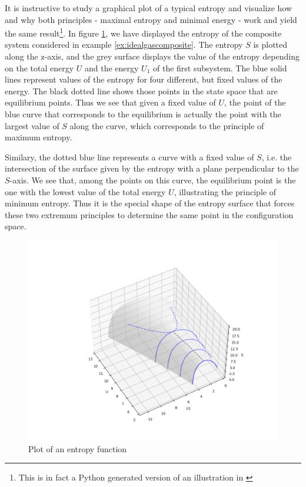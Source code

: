 \documentclass[a4paper, draft]{article}
\theoremstyle{own}
\theoremstyle{remark}
\begin{document}
It is instructive to study a graphical plot of a typical entropy and visualize how and why both principles - maximal entropy and minimal energy - work and yield the same result\footnote{This is in fact a Python generated version of an illustration in \cite{Callen}}.
In figure \ref{fig:EntropyPlot}, we have displayed the entropy of the composite system considered in example \ref{ex:idealgascomposite}. The entropy $S$ is plotted along the z-axis, and the grey surface displays the value of the entropy depending on the total energy $U$ and the energy $U_1$ of the first subsystem. The blue solid lines represent values of the entropy for four different, but fixed values of the energy. The black dotted line shows those points in the state space that are equilibrium points. Thus we see that given a fixed value of $U$, the point of the blue curve that corresponds to the equilibrium is actually the point with the largest value of $S$ along the curve, which corresponds to the principle of maximum entropy.

Similary, the dotted blue line represents a curve with a fixed value of $S$, i.e. the intersection of the surface given by the entropy with a plane perpendicular to the $S$-axis. We see that, among the points on this curve, the equilibrium point is the one with the lowest value of the total energy $U$, illustrating the principle of minimum entropy. Thus it is the special shape of the entropy surface that forces these two extremum principles to determine the same point in the configuration space.


\begin{figure}[ht]
\includegraphics[scale=0.5]{EntropyPlot}
\caption{Plot of an entropy function}
\label{fig:EntropyPlot}
\end{figure}
\end{document}
